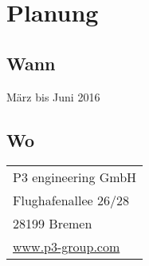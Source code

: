 \section{Planung}
\label{sec:planung}

  \subsection{Wann}
  \label{ssec:wann}
    März bis Juni 2016

  \subsection{Wo}
  \label{ssec:wo}
    \begin{tabular}{l}
      P3 engineering GmbH\\
      Flughafenallee 26/28\\
      28199 Bremen\\
      \href{www.p3-group.com}{www.p3-group.com}\\
    \end{tabular}

